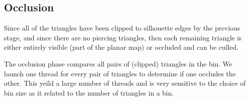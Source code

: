 \documentclass[review]{acmsiggraph}
\begin{document}
\subsection{Occlusion}

Since all of the triangles have been clipped to silhouette edges by the
previous stage, and since there are no piercing triangles, then each remaining
triangle is either entirely visible (part of the planar map) or occluded and
can be culled.

The occlusion phase compares all pairs of (clipped) triangles in the bin. We
launch one thread for every pair of triangles to determine if one occludes the
other. This yeild a large number of threads and is very sensitive to the
choice of bin size as it related to the number of triangles in a bin.



\end{document}

